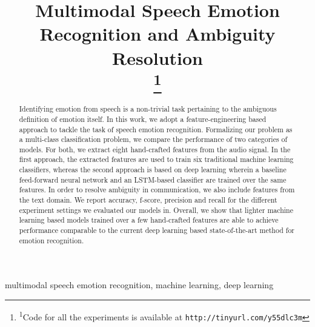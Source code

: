 \documentclass[conference]{IEEEtran}
\begin{document}
\title{Multimodal Speech Emotion Recognition and Ambiguity Resolution\\
{\footnotesize}
\thanks{\textsuperscript{1}Code for all the experiments is available at \texttt{http://tinyurl.com/y55dlc3m}}
}

\author{
}

\maketitle

\begin{abstract}
Identifying emotion from speech is a non-trivial task pertaining to the ambiguous definition of emotion itself. In this work, we adopt a feature-engineering based approach to tackle the task of speech emotion recognition. Formalizing our problem as a multi-class classification problem, we compare the performance of two categories of models. For both, we extract eight hand-crafted features from the audio signal. In the first approach, the extracted features are used to train six traditional machine learning classifiers, whereas the second approach is based on deep learning wherein a baseline feed-forward neural network and an LSTM-based classifier are trained over the same features. In order to resolve ambiguity in communication, we also include features from the text domain. We report accuracy, f-score, precision and recall for the different experiment settings we evaluated our models in. Overall, we show that lighter machine learning based models trained over a few hand-crafted features are able to achieve performance comparable to the current deep learning based state-of-the-art method for emotion recognition.
\end{abstract}

\begin{IEEEkeywords}
multimodal speech emotion recognition, machine learning, deep learning
\end{IEEEkeywords}
\end{document}
